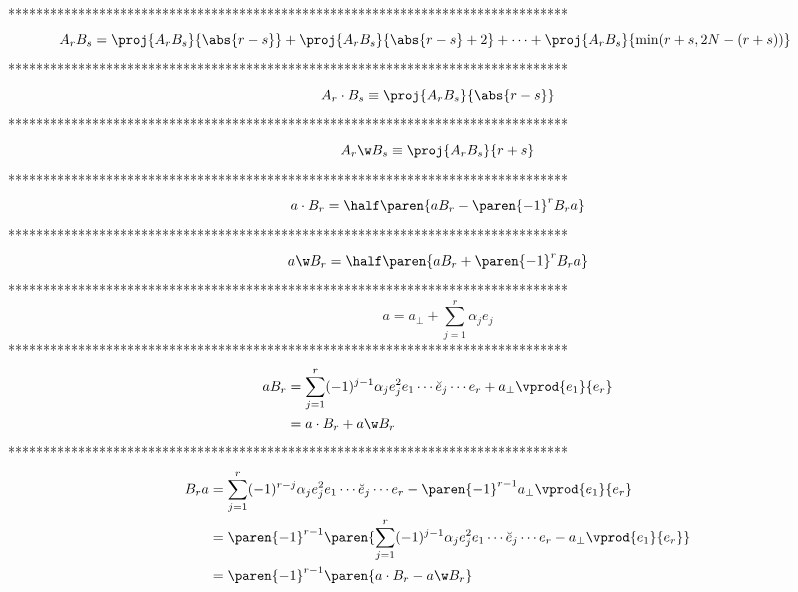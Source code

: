 ********************************************************************************
\begin{equation}\label{EQ1_39}
\hspace{-0.25in}A_{r}B_{s} = \proj{A_{r}B_{s}}{\abs{r-s}}+\proj{A_{r}B_{s}}{\abs{r-s}+2}+\cdots+
             \proj{A_{r}B_{s}}{\min(r+s,2N-(r+s))}
\end{equation}
********************************************************************************
\begin{equation}\label{EQ1_40}
A_{r}\cdot B_{s} \equiv \proj{A_{r}B_{s}}{\abs{r-s}}
\end{equation}
********************************************************************************
\begin{equation}\label{EQ1_41}
A_{r}\w B_{s} \equiv \proj{A_{r}B_{s}}{r+s}
\end{equation}
********************************************************************************
\begin{equation}\label{EQ1_42}
     a\cdot B_{r} = \half\paren{aB_{r}-\paren{-1}^{r}B_{r}a}
\end{equation}
********************************************************************************
\begin{equation}\label{EQ1_43}
     a\w B_{r} = \half\paren{aB_{r}+\paren{-1}^{r}B_{r}a}
\end{equation}
********************************************************************************
\begin{equation}\label{EQ1_44}
a = a_{\perp}+\sum^{r}_{j=1}\alpha_{j}e_{j}
\end{equation}
********************************************************************************
\begin{align}\label{27}
aB_{r} & = \sum^{r}_{j=1}(-1)^{j-1}\alpha_{j}e_{j}^{2}e_{1}\cdots \breve{e}_{j}\cdots e_{r}
              +a_{\perp}\vprod{e_{1}}{e_{r}} \nonumber  \\
       & = a\cdot B_{r} + a\w B_{r}\label{EQ1_45}
\end{align}
********************************************************************************
\begin{align}\label{30}
B_{r}a & = \sum^{r}_{j=1}(-1)^{r-j}\alpha_{j}e_{j}^{2}e_{1}\cdots \breve{e}_{j}\cdots e_{r}
           -\paren{-1}^{r-1}a_{\perp}\vprod{e_{1}}{e_{r}} \nonumber  \\
       & = \paren{-1}^{r-1}\paren{\sum^{r}_{j=1}(-1)^{j-1}\alpha_{j}e_{j}^{2}e_{1}\cdots \breve{e}_{j}\cdots e_{r}
           -a_{\perp}\vprod{e_{1}}{e_{r}}} \nonumber  \\
       & = \paren{-1}^{r-1}\paren{a\cdot B_{r}-a\w B_{r}} \label{EQ1_46}
\end{align}
